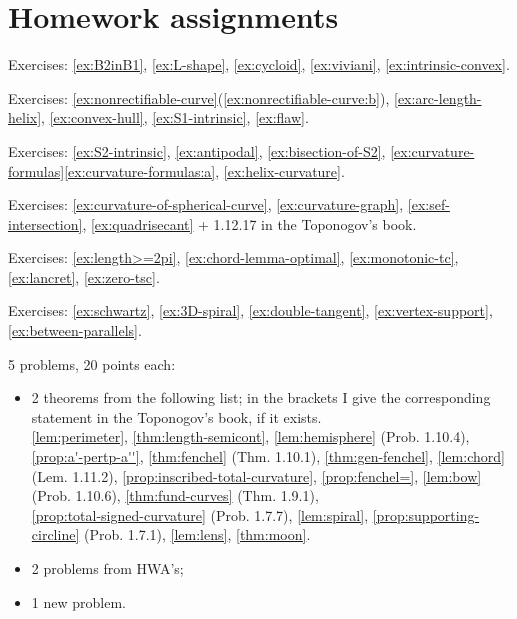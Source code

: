 \chapter{Homework assignments}

Exercises: 
\ref{ex:B2inB1}, 
\ref{ex:L-shape}, 
\ref{ex:cycloid}, 
\ref{ex:viviani}, 
\ref{ex:intrinsic-convex}.

Exercises: 
\ref{ex:nonrectifiable-curve}(\ref{ex:nonrectifiable-curve:b}), 
\ref{ex:arc-length-helix}, 
\ref{ex:convex-hull},  
\ref{ex:S1-intrinsic},  
\ref{ex:flaw}.

Exercises:
\ref{ex:S2-intrinsic},
\ref{ex:antipodal},
\ref{ex:bisection-of-S2}, 
\ref{ex:curvature-formulas}\ref{ex:curvature-formulas:a},    
\ref{ex:helix-curvature}.


Exercises:
\ref{ex:curvature-of-spherical-curve},
\ref{ex:curvature-graph},
\ref{ex:sef-intersection},
\ref{ex:quadrisecant} 
+
1.12.17 in the Toponogov's book.

Exercises:
\ref{ex:length>=2pi},
\ref{ex:chord-lemma-optimal},
\ref{ex:monotonic-tc},
\ref{ex:lancret},
\ref{ex:zero-tsc}.

Exercises:
\ref{ex:schwartz},
\ref{ex:3D-spiral},
\ref{ex:double-tangent},
\ref{ex:vertex-support},
\ref{ex:between-parallels}.

 5 problems, 20 points each:
\begin{itemize}
\item 2 theorems from the following list; in the brackets I give the corresponding statement in the Toponogov's book, if it exists.\\
\ref{lem:perimeter},
\ref{thm:length-semicont},
\ref{lem:hemisphere} (Prob. 1.10.4),\\
\ref{prop:a'-pertp-a''},
\ref{thm:fenchel} (Thm. 1.10.1),
\ref{thm:gen-fenchel},
\ref{lem:chord} (Lem. 1.11.2),
\ref{prop:inscribed-total-curvature},
\ref{prop:fenchel=},
\ref{lem:bow} (Prob. 1.10.6),
\ref{thm:fund-curves} (Thm. 1.9.1),\\
\ref{prop:total-signed-curvature} (Prob. 1.7.7),
\ref{lem:spiral},
\ref{prop:supporting-circline} (Prob. 1.7.1),
\ref{lem:lens},
\ref{thm:moon}.
\item 2 problems from HWA's;
\item 1 new problem.
\end{itemize}

